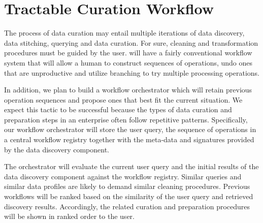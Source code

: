 \section{Tractable Curation Workflow}
\label{sec:workflow}

The process of data curation may entail multiple iterations of data discovery, data stitching, querying and data curation. For sure, cleaning and transformation procedures must be guided by the user. \dcv will have a fairly conventional workflow system that will allow a human to construct sequences of operations, undo ones that are unproductive and utilize branching to try multiple processing operations.


In addition, we plan to build a workflow orchestrator which will retain previous operation sequences and propose ones that best fit the current situation. We expect this tactic to be successful because the types of data curation and preparation steps in an enterprise often follow repetitive patterns.  Specifically, our workflow orchestrator will store the user query, the sequence of operations in a central workflow registry together with the meta-data and signatures provided by the data discovery component. 


The orchestrator will evaluate the current user query and the initial results of the data discovery component against the workflow registry. Similar queries and similar data profiles are likely to demand similar cleaning procedures. Previous workflows will be ranked based on the similarity of the user query and retrieved discovery results. Accordingly, the related curation and preparation procedures will be shown in ranked order to the user.